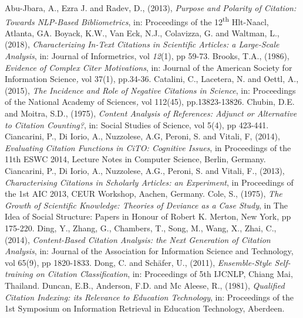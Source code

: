 \documentclass[runningheads,a4paper]{llncs}
\begin{document}
\begin{thebibliography}{4}

 Abu-Jbara, A., Ezra J. and Radev, D., (2013), {\em Purpose and Polarity of Citation: Towards NLP-Based Bibliometrics}, in: Proceedings of the 12\textsuperscript{th} Hlt-Naacl, Atlanta, GA.
 Boyack, K.W., Van Eck, N.J., Colavizza, G. and Waltman, L., (2018), {\em Characterizing In-Text Citations in Scientific Articles: a Large-Scale Analysis}, in: Journal of Informetrics, vol {\em 12}(1), pp 59-73.
 Brooks, T.A., (1986), {\em Evidence of Complex Citer Motivations}, in: Journal of the American Society for Information Science{\em , }vol 37(1), pp.34-36.
 Catalini, C., Lacetera, N. and Oettl, A., (2015), {\em The Incidence and Role of Negative Citations in Science}, in: Proceedings of the National Academy of Sciences{\em , }vol 112(45), pp.13823-13826.
 Chubin, D.E. and Moitra, S.D., (1975), {\em Content Analysis of References: Adjunct or Alternative to Citation Counting?}, in: Social Studies of Science, vol 5(4), pp 423-441.
 Ciancarini, P., Di Iorio, A., Nuzzolese, A.G, Peroni, S. and Vitali, F, (2014), {\em Evaluating Citation Functions in CiTO: Cognitive Issues}, in Proceedings of the 11th ESWC 2014, Lecture Notes in Computer Science, Berlin, Germany.
 Ciancarini, P., Di Iorio, A., Nuzzolese, A.G., Peroni, S. and Vitali, F., (2013), {\em Characterising Citations in Scholarly Articles: an Experiment}, in Proceedings of the 1st AIC 2013, CEUR Workshop, Aachen, Germany.
 Cole, S., (1975), {\em The Growth of Scientific Knowledge: Theories of Deviance as a Case Study}, in The Idea of Social Structure: Papers in Honour of Robert K. Merton, New York, pp 175-220.
 Ding, Y., Zhang, G., Chambers, T., Song, M., Wang, X., Zhai, C., (2014), {\em Content-Based Citation Analysis: the Next Generation of Citation Analysis}, in: Journal of the Association for Information Science and Technology, vol 65(9), pp 1820-1833.
 Dong, C. and Schäfer, U., (2011), {\em Ensemble-Style Self-training on Citation Classification}, in: Proceedings of 5th IJCNLP, Chiang Mai, Thailand.
 Duncan, E.B., Anderson, F.D. and Mc Aleese, R., (1981), {\em Qualified Citation Indexing: its Relevance to Education Technology}, in: Proceedings of the 1st Symposium on Information Retrieval in Education Technology, Aberdeen.

\end{thebibliography}
\end{document}
